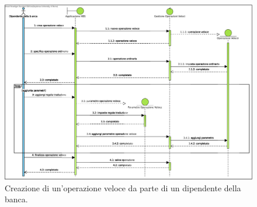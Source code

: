 \begin{figure}[h]
    \centering
    \includegraphics[height=\textwidth, angle=90]{Images/sequence/Creazione_Operazione_Veloce.eps}
    \caption{Creazione di un'operazione veloce da parte di un dipendente della banca.}
    \label{fig:sequence:crezione-operazione-veloce}
\end{figure}
